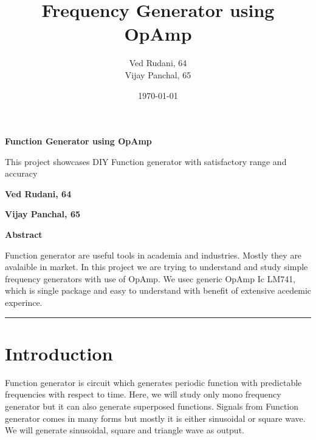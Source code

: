 \documentclass{article}
\author{Ved Rudani, 64 \\
Vijay Panchal, 65}
\date{\today}
\title{Frequency Generator using OpAmp}
\begin{document}
\maketitle
\tableofcontents

\pagebreak

\begin{center}
\Huge
\textbf{Function Generator using OpAmp}


\vspace{0.3cm}
\normalsize
This project showcases DIY Function generator with satisfactory range and accuracy


\vspace{0.6cm}
\textbf{Ved Rudani, 64}


\vspace{0.1cm}
\textbf{Vijay Panchal, 65}


\vspace{1cm}


\colorbox{bg1}{
\begin{minipage}{1\textwidth}\centering
        \vspace{1.5cm}
        \Large
        \textbf{Abstract}

        \begin{minipage}{0.7\textwidth}
        \vspace{.8cm}
        \normalsize
        Function generator are useful tools in academia and industries. Mostly they are avalaible in market. In this project we are trying to understand and study simple frequency generators with use of OpAmp. We usec generic OpAmp Ic LM741, which is single package and easy to understand with benefit of extensive acedemic experince.
        \vspace{1.5cm}
        \end{minipage}

\end{minipage}}

\vspace{1.5cm}
\noindent
\color{grey} \rule{\linewidth}{0.5mm}
\end{center}



\section{Introduction}
\label{sec:orga831efd}
Function generator is circuit which generates periodic function with predictable frequencies with respect to time. Here, we will study only mono frequency generator but it can also generate superposed functions. Signals from Function generator comes in many forms but mostly it is either sinusoidal or square wave. We will generate sinusoidal, square and triangle wave as output. 
\end{document}
